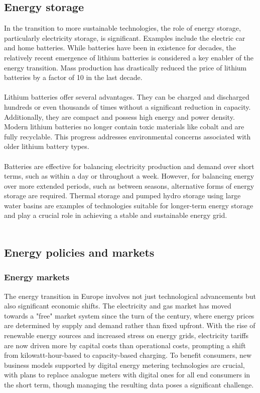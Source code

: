\documentclass[../summary.tex]{subfiles}
\begin{document}
\subsection{Energy storage}

In the transition to more sustainable technologies, the role of energy storage, particularly electricity storage, is significant. Examples include the electric car and home batteries. While batteries have been in existence for decades, the relatively recent emergence of lithium batteries is considered a key enabler of the energy transition. Mass production has drastically reduced the price of lithium batteries by a factor of 10 in the last decade.\\
\\
Lithium batteries offer several advantages. They can be charged and discharged hundreds or even thousands of times without a significant reduction in capacity. Additionally, they are compact and possess high energy and power density. Modern lithium batteries no longer contain toxic materials like cobalt and are fully recyclable. This progress addresses environmental concerns associated with older lithium battery types.\\
\\
Batteries are effective for balancing electricity production and demand over short terms, such as within a day or throughout a week. However, for balancing energy over more extended periods, such as between seasons, alternative forms of energy storage are required. Thermal storage and pumped hydro storage using large water basins are examples of technologies suitable for longer-term energy storage and play a crucial role in achieving a stable and sustainable energy grid.
\\\\

\subsection{Energy policies and markets}
\subsubsection{Energy markets}

The energy transition in Europe involves not just technological advancements but also significant economic shifts. The electricity and gas market has moved towards a "free" market system since the turn of the century, where energy prices are determined by supply and demand rather than fixed upfront. With the rise of renewable energy sources and increased stress on energy grids, electricity tariffs are now driven more by capital costs than operational costs, prompting a shift from kilowatt-hour-based to capacity-based charging. To benefit consumers, new business models supported by digital energy metering technologies are crucial, with plans to replace analogue meters with digital ones for all end consumers in the short term, though managing the resulting data poses a significant challenge.
\end{document}
